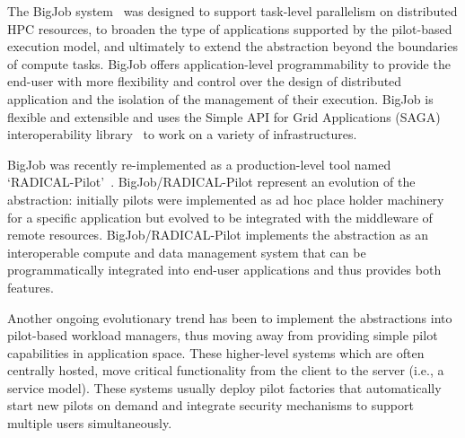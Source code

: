 \documentclass{sig-alternate}
\begin{document}
The BigJob \pilotjob system~\cite{luckow2010} was designed to support task-level
parallelism on distributed HPC resources, to broaden the type of applications
supported by the pilot-based execution model, and ultimately to extend the
\pilot abstraction beyond the boundaries of compute tasks. BigJob offers
application-level programmability to provide the end-user with more flexibility
and control over the design of distributed application and the isolation of the
management of their execution. BigJob is flexible and extensible and uses the
Simple API for Grid Applications (SAGA) interoperability
library~\cite{merzky2015saga,goodale2006,luckow2010} to work on a variety of
infrastructures.




BigJob was recently re-implemented as a production-level tool named
`RADICAL-Pilot'~\cite{merzky2015radical}. BigJob/RADICAL-Pilot represent an
evolution of the \pilot abstraction: initially pilots were implemented as ad hoc
place holder machinery for a specific application but evolved to be integrated
with the middleware of remote resources. BigJob/RADICAL-Pilot implements the
\pilot abstraction as an interoperable compute and data management system that
can be programmatically integrated into end-user applications and thus provides
both features.

Another ongoing evolutionary trend has been to implement the \pilot abstractions
into pilot-based workload managers, thus moving away from providing simple pilot
capabilities in application space. These higher-level systems which are often
centrally hosted, move critical functionality from the client to the server
(i.e., a service model). These systems usually deploy pilot factories that
automatically start new pilots on demand and integrate security mechanisms to
support multiple users simultaneously.

\end{document}

